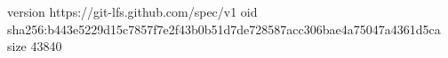 version https://git-lfs.github.com/spec/v1
oid sha256:b443e5229d15c7857f7e2f43b0b51d7de728587acc306bae4a75047a4361d5ca
size 43840
